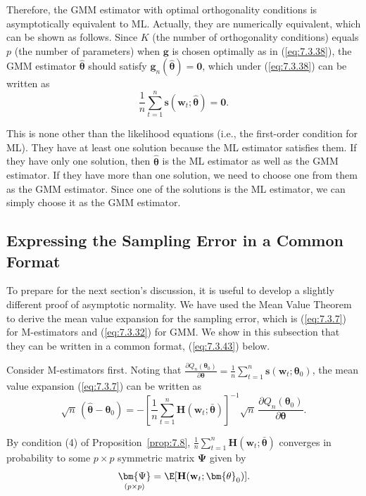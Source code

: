 Therefore, the GMM estimator with optimal orthogonality conditions is asymptotically equivalent to ML. Actually, they are numerically equivalent, which can be shown as follows. Since $K$ (the number of orthogonality conditions) equals $p$ (the number of parameters) when $\mathbf{g}$ is chosen optimally as in (\ref{eq:7.3.38}), the GMM estimator $\hat{\bm{\theta}}$ should satisfy $\mathbf{g}_n(\hat{\bm{\theta}}) = \mathbf{0}$, which under (\ref{eq:7.3.38}) can be written as
\begin{equation}
\label{eq:7.3.39}
\frac{1}{n}\sum_{t=1}^{n}\mathbf{s}(\mathbf{w}_t; \hat{\bm{\theta}}) = \mathbf{0}.
\end{equation}

This is none other than the likelihood equations (i.e., the first-order condition for ML). They have at least one solution because the ML estimator satisfies them. If they have only one solution, then $\hat{\bm{\theta}}$ is the ML estimator as well as the GMM estimator. If they have more than one solution, we need to choose one from them as the GMM estimator. Since one of the solutions is the ML estimator, we can simply choose it as the GMM estimator.

\subsection*{Expressing the Sampling Error in a Common Format}

To prepare for the next section's discussion, it is useful to develop a slightly different proof of asymptotic normality. We have used the Mean Value Theorem to derive the mean value expansion for the sampling error, which is (\ref{eq:7.3.7}) for M-estimators and (\ref{eq:7.3.32}) for GMM. We show in this subsection that they can be written in a common format, (\ref{eq:7.3.43}) below.

Consider M-estimators first. Noting that $\frac{\partial Q_n(\bm{\theta}_0)}{\partial\bm{\theta}} = \frac{1}{n}\sum_{t=1}^{n}\mathbf{s}(\mathbf{w}_t; \bm{\theta}_0)$, the mean value expansion (\ref{eq:7.3.7}) can be written as
\begin{equation}
\label{eq:7.3.40}
\sqrt{n}\,(\hat{\bm{\theta}} - \bm{\theta}_0) = -\left[\frac{1}{n}\sum_{t=1}^{n}\mathbf{H}(\mathbf{w}_t; \bar{\bm{\theta}})\right]^{-1}\sqrt{n}\,\frac{\partial Q_n(\bm{\theta}_0)}{\partial\bm{\theta}}.
\end{equation}

By condition (4) of Proposition~\ref{prop:7.8}, $\frac{1}{n}\sum_{t=1}^{n}\mathbf{H}(\mathbf{w}_t; \bar{\bm{\theta}})$ converges in probability to some $p \times p$ symmetric matrix $\bm{\Psi}$ given by
\begin{equation}
\label{eq:7.3.41}
\underset{(p \times p)}{\bm{\Psi}} = \E[\mathbf{H}(\mathbf{w}_t; \bm{\theta}_0)].
\end{equation}

